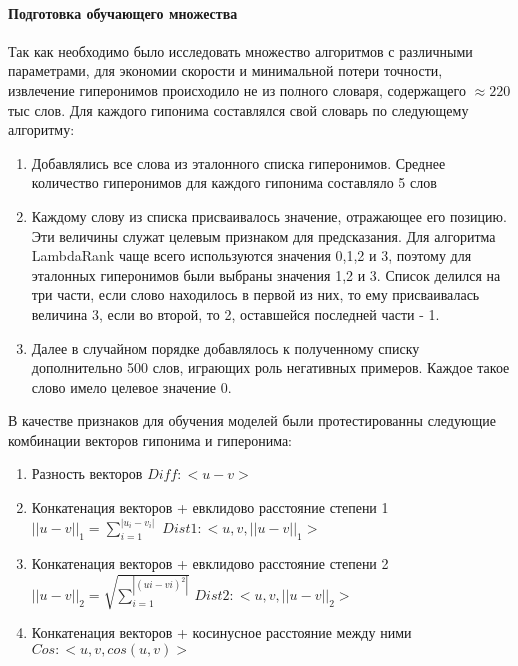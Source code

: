 \paragraph{Подготовка обучающего множества}

Так как необходимо было исследовать множество алгоритмов с различными параметрами,
для экономии скорости и минимальной потери точности, извлечение гиперонимов
происходило не из полного словаря, содержащего $\approx 220$ тыс слов. Для каждого гипонима
составлялся свой словарь по следующему алгоритму:

\begin{enumerate}
\item Добавлялись все слова из эталонного списка гиперонимов. Среднее количество
гиперонимов для каждого гипонима составляло 5 слов

\item Каждому слову из списка присваивалось значение, отражающее его позицию. Эти
величины служат целевым признаком для предсказания. Для алгоритма
LambdaRank чаще всего используются значения 0,1,2 и 3, поэтому для эталонных
гиперонимов были выбраны значения 1,2 и 3. Список делился на три части, если
слово находилось в первой из них, то ему присваивалась величина 3, если во
второй, то 2, оставшейся последней части - 1.

\item Далее в случайном порядке добавлялось к полученному списку дополнительно 500
слов, играющих роль негативных примеров. Каждое такое слово имело целевое
значение 0.
\end{enumerate}

В качестве признаков для обучения моделей были протестированны следующие
комбинации векторов гипонима и гиперонима:

\begin{enumerate}
\item Разность векторов
$Diff: <u - v>$

\item Конкатенация векторов + евклидово расстояние степени 1
$||u - v||_1 = \sum_{i=1}^{|u_i - v_i|}$
$Dist1: <u, v, ||u - v||_1>$

\item Конкатенация векторов + евклидово расстояние степени 2
$||u - v||_2 = \sqrt{\sum_{i=1}^{|(ui - vi)^2|}}$
$Dist2: <u, v, || u - v ||_2>$

\item Конкатенация векторов + косинусное расстояние между ними
$Cos: <u, v, cos(u, v)>$
\end{enumerate}


